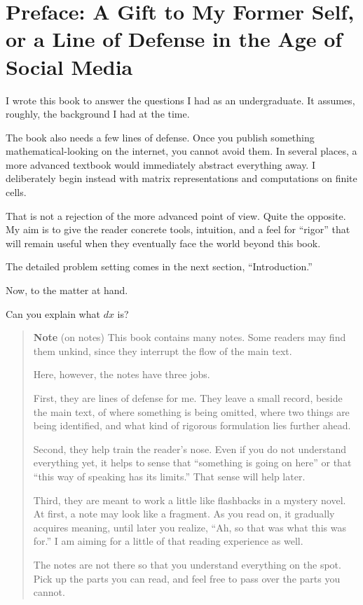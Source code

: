 \hypertarget{preface-a-gift-to-my-former-self-or-a-line-of-defense-in-the-age-of-social-media}{%
\chapter{Preface: A Gift to My Former Self, or a Line of Defense in the
Age of Social
Media}\label{preface-a-gift-to-my-former-self-or-a-line-of-defense-in-the-age-of-social-media}}

I wrote this book to answer the questions I had as an undergraduate. It
assumes, roughly, the background I had at the time.

The book also needs a few lines of defense. Once you publish something
mathematical-looking on the internet, you cannot avoid them. In several
places, a more advanced textbook would immediately abstract everything
away. I deliberately begin instead with matrix representations and
computations on finite cells.

That is not a rejection of the more advanced point of view. Quite the
opposite. My aim is to give the reader concrete tools, intuition, and a
feel for ``rigor'' that will remain useful when they eventually face the
world beyond this book.

The detailed problem setting comes in the next section,
``Introduction.''

Now, to the matter at hand.

Can you explain what \(dx\) is?

\begin{quote}
\textbf{Note} (on notes) This book contains many notes. Some readers may
find them unkind, since they interrupt the flow of the main text.

Here, however, the notes have three jobs.

First, they are lines of defense for me. They leave a small record,
beside the main text, of where something is being omitted, where two
things are being identified, and what kind of rigorous formulation lies
further ahead.

Second, they help train the reader's nose. Even if you do not understand
everything yet, it helps to sense that ``something is going on here'' or
that ``this way of speaking has its limits.'' That sense will help
later.

Third, they are meant to work a little like flashbacks in a mystery
novel. At first, a note may look like a fragment. As you read on, it
gradually acquires meaning, until later you realize, ``Ah, so that was
what this was for.'' I am aiming for a little of that reading experience
as well.

The notes are not there so that you understand everything on the spot.
Pick up the parts you can read, and feel free to pass over the parts you
cannot.
\end{quote}

